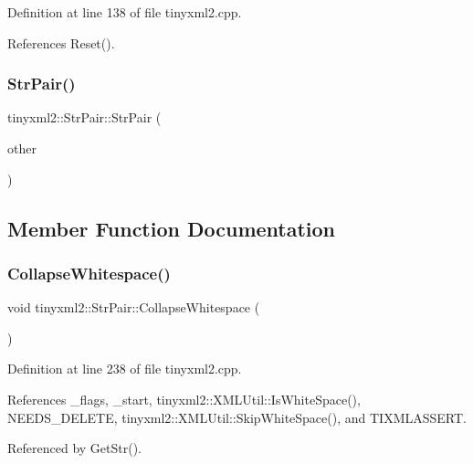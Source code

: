 Definition at line 138 of file tinyxml2.\+cpp.



References Reset().

\mbox{\label{classtinyxml2_1_1_str_pair_ac43c1f4a5730c5582f9cff724376d106}} 
\subsubsection{StrPair()\hspace{0.1cm}{\footnotesize\ttfamily [2/2]}}
{\footnotesize\ttfamily tinyxml2\+::\+Str\+Pair\+::\+Str\+Pair (\begin{DoxyParamCaption}\item[{const \textbf{ Str\+Pair} \&}]{other }\end{DoxyParamCaption})\hspace{0.3cm}{\ttfamily [private]}}



\subsection{Member Function Documentation}
\mbox{\label{classtinyxml2_1_1_str_pair_ade1469025e6b4cac74397a82a7429337}} 
\subsubsection{CollapseWhitespace()}
{\footnotesize\ttfamily void tinyxml2\+::\+Str\+Pair\+::\+Collapse\+Whitespace (\begin{DoxyParamCaption}{ }\end{DoxyParamCaption})\hspace{0.3cm}{\ttfamily [private]}}



Definition at line 238 of file tinyxml2.\+cpp.



References \+\_\+flags, \+\_\+start, tinyxml2\+::\+X\+M\+L\+Util\+::\+Is\+White\+Space(), N\+E\+E\+D\+S\+\_\+\+D\+E\+L\+E\+TE, tinyxml2\+::\+X\+M\+L\+Util\+::\+Skip\+White\+Space(), and T\+I\+X\+M\+L\+A\+S\+S\+E\+RT.



Referenced by Get\+Str().

